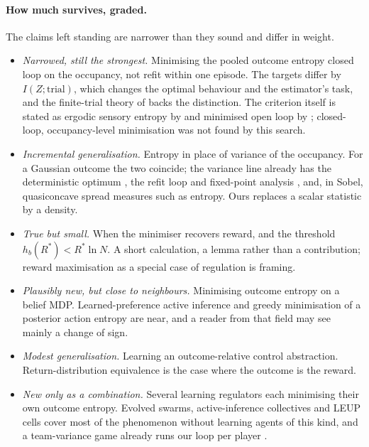 \documentclass[10pt]{article}
\begin{document}
\paragraph{How much survives, graded.}
The claims left standing are narrower than they sound and differ in weight.
\begin{itemize}
\item \emph{Narrowed, still the strongest.} Minimising the pooled outcome entropy closed loop on the occupancy, not refit within one episode. The targets differ by $I(Z;\text{trial})$, which changes the optimal behaviour and the estimator's task, and the finite-trial theory of \citet{Mutti-convex23} backs the distinction. The criterion itself is stated as ergodic sensory entropy by \citet{Friston-free12c} and minimised open loop by \citet{Adurthi-minimum14}; closed-loop, occupancy-level minimisation was not found by this search.
\item \emph{Incremental generalisation.} Entropy in place of variance of the occupancy. For a Gaussian outcome the two coincide; the variance line already has the deterministic optimum \citep{Filar-variance89,Sobel-meanvariance94}, the refit loop and fixed-point analysis \citep{Xia-optimization16,Xia-global26}, and, in Sobel, quasiconcave spread measures such as entropy. Ours replaces a scalar statistic by a density.
\item \emph{True but small.} When the minimiser recovers reward, and the threshold $h_b(R^*)<R^*\ln N$. A short calculation, a lemma rather than a contribution; reward maximisation as a special case of regulation is framing.
\item \emph{Plausibly new, but close to neighbours.} Minimising outcome entropy on a belief MDP. Learned-preference active inference \citep{Sajid-exploration21,Kim-emergence25} and greedy minimisation of a posterior action entropy \citep{Greigarn-taskoriented19} are near, and a reader from that field may see mainly a change of sign.
\item \emph{Modest generalisation.} Learning an outcome-relative control abstraction. Return-distribution equivalence \citep{Castro-equivalence09,Liu-returnbased21} is the case where the outcome is the reward.
\item \emph{New only as a combination.} Several learning regulators each minimising their own outcome entropy. Evolved swarms, active-inference collectives and LEUP cells cover most of the phenomenon without learning agents of this kind, and a team-variance game already runs our loop per player \citep{Xia-team25}.
\end{itemize}
\end{document}
